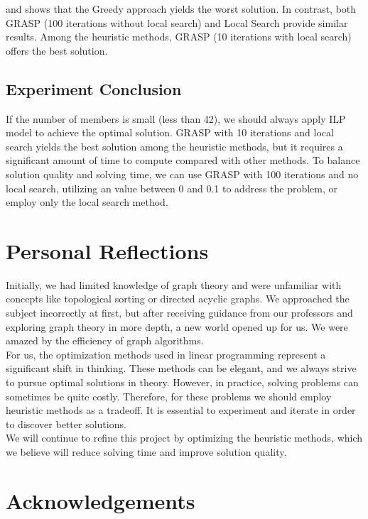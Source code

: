 \documentclass{article}
\begin{document}
 and  shows that the Greedy approach yields the worst solution. In contrast, both GRASP (100 iterations without local search) and Local Search provide similar results. Among the heuristic methods, GRASP (10 iterations with local search) offers the best solution.


\subsection{Experiment Conclusion}

If the number of members is small (less than 42), we should always apply ILP model to achieve the optimal solution.
GRASP with 10 iterations and local search yields the best solution among the heuristic methods, but it requires a significant amount of time to compute compared with other methods. To balance solution quality and solving time, we can use GRASP with 100 iterations and no local search, utilizing an \bm{$\alpha$} value between 0 and 0.1 to address the problem, or employ only the local search method.

\section{Personal Reflections}

Initially, we had limited knowledge of graph theory and were unfamiliar with concepts like topological sorting or directed acyclic graphs. We approached the subject incorrectly at first, but after receiving guidance from our professors and exploring graph theory in more depth, a new world opened up for us. We were amazed by the efficiency of graph algorithms.\\
For us, the optimization methods used in linear programming represent a significant shift in thinking. These methods can be elegant, and we always strive to pursue optimal solutions in theory. However, in practice, solving problems can sometimes be quite costly. Therefore, for these problems we should employ heuristic methods as a tradeoff. It is essential to experiment and iterate in order to discover better solutions.\\
We will continue to refine this project by optimizing the heuristic methods, which we believe will reduce solving time and improve solution quality.


\section{Acknowledgements}
\end{document}
